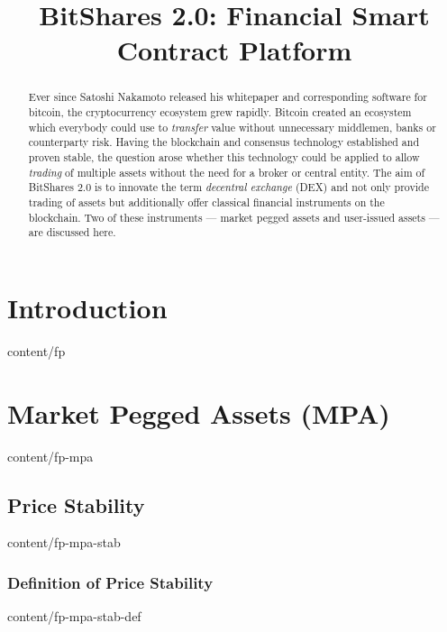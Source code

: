\documentclass[conference,final,10pt,a4paper]{IEEEtran}
\title{BitShares 2.0: Financial Smart Contract Platform}
\begin{document}
\sloppy
\maketitle

\begin{abstract}

 Ever since Satoshi Nakamoto released his whitepaper and corresponding software
 for bitcoin, the cryptocurrency ecosystem grew rapidly. Bitcoin created an
 ecosystem which everybody could use to \emph{transfer} value without
 unnecessary middlemen, banks or counterparty risk. Having the blockchain
 and consensus technology established and proven stable, the question arose
 whether this technology could be applied to allow \emph{trading} of multiple
 assets without the need for a broker or central entity.
 The aim of BitShares 2.0 is to innovate the term \emph{decentral exchange}
 (DEX) and not only provide trading of assets but additionally offer classical
 financial instruments on the blockchain. Two of these instruments ---
 market pegged assets and user-issued assets --- are discussed here.

\end{abstract}
\section        { Introduction                                     }  { content/fp                     } 

\section        { Market Pegged Assets (MPA)                       }  { content/fp-mpa                 } 
\subsection     { Price Stability                                  }  { content/fp-mpa-stab            } 
\subsubsection  { Definition of Price Stability                    }  { content/fp-mpa-stab-def        } 
\end{document}
